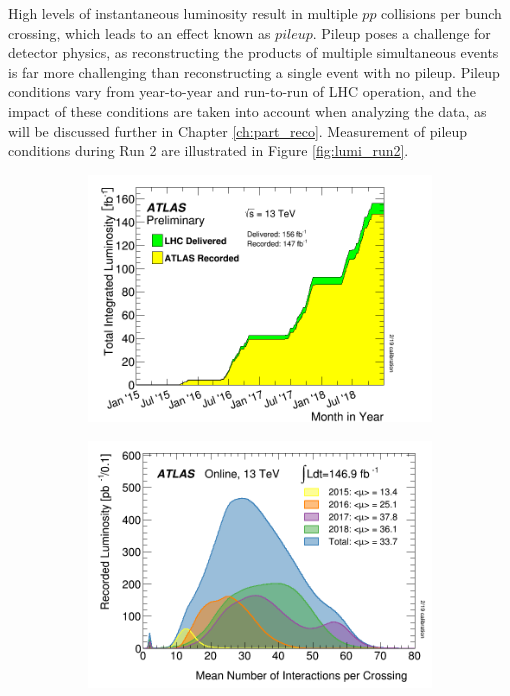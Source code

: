 High levels of instantaneous luminosity result in multiple $pp$ collisions per bunch crossing, which leads to an effect known as $pileup$. Pileup poses a challenge for detector physics, as reconstructing the products of multiple simultaneous events is far more challenging than reconstructing a single event with no pileup. Pileup conditions vary from year-to-year and run-to-run of LHC operation, and the impact of these conditions are taken into account when analyzing the data, as will be discussed further in Chapter \ref{ch:part_reco}. Measurement of pileup conditions during Run 2 are illustrated in Figure \ref{fig:lumi_run2}. \par
 
 \begin{figure}
     \centering
     \begin{subfigure}[b]{0.49\textwidth}
         \centering
         \includegraphics[width=\textwidth]{figures/ch3/lumi_integrated.png}
     \end{subfigure}
     \hfill  
     \begin{subfigure}[b]{0.48\textwidth}
         \centering
         \includegraphics[width=\textwidth]{figures/ch3/lumi_instantaneous.png}

\end{subfigure}
\end{figure}
